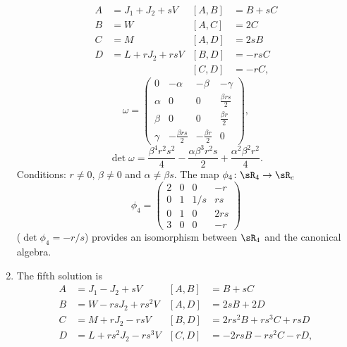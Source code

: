 \begin{enumerate}
	      \begin{align*}
		      A & =J_{1}+J_{2}+sV & [A,B] & =B+sC \\
		      B & =W              & [A,C] & =2C   \\
		      C & =M              & [A,D] & =2sB  \\
		      D & =L+rJ_{2}+rsV   & [B,D] & =-rsC \\
		        &                 & [C,D] & =-rC,
	      \end{align*}
	      \begin{equation}
		      \omega=\begin{pmatrix}
			      0      & -\alpha                   & -\beta               & -\gamma                  \\
			      \alpha & 0                         & 0                    & \frac{ \beta r s  }{ 2 } \\
			      \beta  & 0                         & 0                    & \frac{ \beta r }{2}      \\
			      \gamma & -\frac{ \beta r s  }{ 2 } & -\frac{ \beta r }{2} & 0
		      \end{pmatrix},
	      \end{equation}
	      \[
		      \det\omega=\frac{ \beta^{4}r^{2}s^{2} }{ 4 }-\frac{ \alpha\beta^{3}r^{2}s }{ 2 }+\frac{ \alpha^{2}\beta^{2}r^{2} }{ 4 }.
	      \]
	      Conditions:  $r\neq 0$, $\beta\neq 0$ and $\alpha\neq\beta s$.  The map $\phi_4\colon \sR_4\to \sR_c$
	      \[
		      \phi_{4}=
		      \begin{pmatrix}
			      2 & 0 & 0   & -r  \\
			      0 & 1 & 1/s & rs  \\
			      0 & 1 & 0   & 2rs \\
			      3 & 0 & 0   & -r
		      \end{pmatrix}
	      \]
	      ($\det\phi_4=-r/s$)  provides an isomorphism between $\sR_{4}$ and the canonical algebra.
	\item The fifth solution is
	      \begin{align*}
		      A & =J_{1}-J_{2}+sV        & [A,B] & =B+sC                 \\
		      B & =W-rsJ_{2}+rs^{2}V     & [A,D] & =2sB+2D               \\
		      C & =M+rJ_{2}-rsV          & [B,D] & =2rs^{2}B+rs^{3}C+rsD \\
		      D & =L+rs^{2}J_{2}-rs^{3}V & [C,D] & =-2rsB-rs^{2}C-rD,    \\
	      \end{align*}

\end{enumerate}
